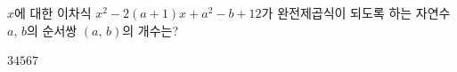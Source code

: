 $x$에 대한 이차식 $x^2-2(a+1)x+a^2-b+12$가 완전제곱식이 되도록 하는 자연수 $a$, $b$의 순서쌍 $(a,\,b)$의 개수는?
\begin{choices32}{$3$}{$4$}{$5$}{$6$}{$7$}\end{choices32}
